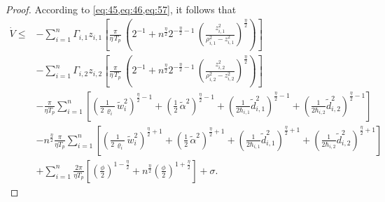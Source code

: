 \documentclass[pdflatex,sn-mathphys-num]{sn-jnl}%
\theoremstyle{thmstyleone}%
\theoremstyle{thmstyletwo}%
\theoremstyle{thmstylethree}%
\begin{document}
\begin{proof}
According to \cref{eq:45,eq:46,eq:57}, it follows that
\begin{equation}\label{eq:58}
	\begin{aligned}
		\dot{V} \le& - \sum_{i=1}^{n}\varGamma_{i,1}z_{i,1}\left[\frac{\pi}{\eta\,T_p}\,
		\left( 2^{-1}+n^{\frac\eta2} 2^{-\tfrac\eta2 -1}\,\left(\frac{z_{i,1}^2}{\rho_{i,1}^2 - z_{i,1}^2}\right)^{\frac{\eta}{2}}\right)  \right]    \\
		&                      
		- \sum_{i=1}^{n}\varGamma_{i,2}z_{i,2}\left[\frac{\pi}{\eta\,T_p}\,
		 \left( 2^{-1}+n^{\frac\eta2} 2^{-\tfrac\eta2 -1}\,\left(\frac{z_{i,2}^2}{\rho_{i,2}^2 - z_{i,2}^2}\right)^{\frac{\eta}{2}}\right)  \right]\\
	&-\frac{\pi}{\eta T_{p}}\sum_{i=1}^{n}\left[ \left(\frac{1}{2\,\varrho_i}\,\tilde w_i^2\right)^{\frac{\eta}{2}-1}+\left(\frac{1}{2}\,{\tilde{\alpha}}^2\right)^{\frac{\eta}{2}-1}+\left(\frac{1}{2\hbar_{i,1}}{\tilde d}^2_{i,1}\right)^{\frac{\eta}{2}-1}+\left(\frac{1}{2\hbar_{i,2}}{\tilde d}^2_{i,2}\right)^{\frac{\eta}{2}-1}\right] \\
		        & - n^{\frac\eta2}\frac{\pi}{\eta T_{p}}\sum_{i=1}^{n}\left[
		\left(\frac{1}{2\,\varrho_i}\,\tilde w_i^2\right)^{\frac{\eta}{2}+1}+\left(\frac{1}{2}\,{\tilde{\alpha}}^2\right)^{\frac{\eta}{2}+1}+\left(\frac{1}{2\hbar_{i,1}}{\tilde d}^2_{i,1}\right)^{\frac{\eta}{2}+1}+\left(\frac{1}{2\hbar_{i,2}}{\tilde d}^2_{i,2}\right)^{\frac{\eta}{2}+1} \right]   \\
		&        
		+\sum_{i=1}^{n}\frac{2\pi}{\eta T_{p}} \left[  \left(\frac{\phi}{2}\right)^{1-\frac{\eta}{2}} + n^{\frac\eta2}\left(\frac{\phi}{2}\right)^{1+\frac{\eta}{2}}  \right]+\sigma  .                  
	\end{aligned}
\end{equation}



\end{proof}
\end{document}
